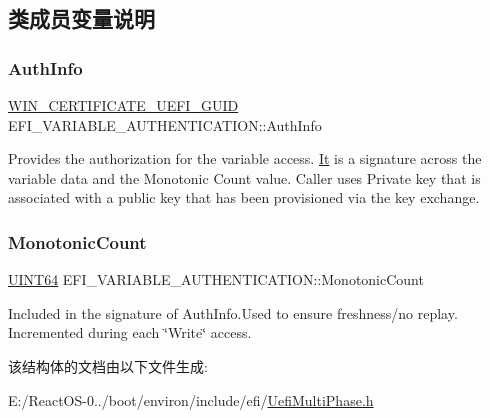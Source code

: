 \subsection{类成员变量说明}
\mbox{\label{struct_e_f_i___v_a_r_i_a_b_l_e___a_u_t_h_e_n_t_i_c_a_t_i_o_n_a69728a7870afdec21157504b489a6e1b}} 
\subsubsection{\texorpdfstring{Auth\+Info}{AuthInfo}}
{\footnotesize\ttfamily \hyperlink{struct_w_i_n___c_e_r_t_i_f_i_c_a_t_e___u_e_f_i___g_u_i_d}{W\+I\+N\+\_\+\+C\+E\+R\+T\+I\+F\+I\+C\+A\+T\+E\+\_\+\+U\+E\+F\+I\+\_\+\+G\+U\+ID} E\+F\+I\+\_\+\+V\+A\+R\+I\+A\+B\+L\+E\+\_\+\+A\+U\+T\+H\+E\+N\+T\+I\+C\+A\+T\+I\+O\+N\+::\+Auth\+Info}

Provides the authorization for the variable access. \hyperlink{class_it}{It} is a signature across the variable data and the Monotonic Count value. Caller uses Private key that is associated with a public key that has been provisioned via the key exchange. \mbox{\label{struct_e_f_i___v_a_r_i_a_b_l_e___a_u_t_h_e_n_t_i_c_a_t_i_o_n_afc0e2555963a8a3046a17ddd2c09350e}} 
\subsubsection{\texorpdfstring{Monotonic\+Count}{MonotonicCount}}
{\footnotesize\ttfamily \hyperlink{_processor_bind_8h_a57be03562867144161c1bfee95ca8f7c}{U\+I\+N\+T64} E\+F\+I\+\_\+\+V\+A\+R\+I\+A\+B\+L\+E\+\_\+\+A\+U\+T\+H\+E\+N\+T\+I\+C\+A\+T\+I\+O\+N\+::\+Monotonic\+Count}

Included in the signature of Auth\+Info.\+Used to ensure freshness/no replay. Incremented during each \char`\"{}\+Write\char`\"{} access. 

该结构体的文档由以下文件生成\+:\begin{DoxyCompactItemize}
\item 
E\+:/\+React\+O\+S-\/0../boot/environ/include/efi/\hyperlink{_uefi_multi_phase_8h}{Uefi\+Multi\+Phase.\+h}\end{DoxyCompactItemize}
